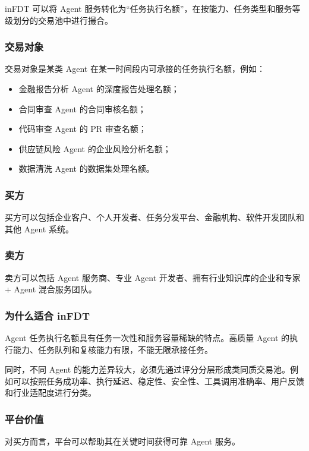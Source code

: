 \documentclass[UTF8,a4paper,12pt]{ctexart}
\begin{document}
inFDT 可以将 Agent 服务转化为“任务执行名额”，在按能力、任务类型和服务等级划分的交易池中进行撮合。

\subsubsection*{交易对象}

交易对象是某类 Agent 在某一时间段内可承接的任务执行名额，例如：

\begin{itemize}
    \item 金融报告分析 Agent 的深度报告处理名额；
    \item 合同审查 Agent 的合同审核名额；
    \item 代码审查 Agent 的 PR 审查名额；
    \item 供应链风险 Agent 的企业风险分析名额；
    \item 数据清洗 Agent 的数据集处理名额。
\end{itemize}

\subsubsection*{买方}

买方可以包括企业客户、个人开发者、任务分发平台、金融机构、软件开发团队和其他 Agent 系统。

\subsubsection*{卖方}

卖方可以包括 Agent 服务商、专业 Agent 开发者、拥有行业知识库的企业和专家 + Agent 混合服务团队。

\subsubsection*{为什么适合 inFDT}

Agent 任务执行名额具有任务一次性和服务容量稀缺的特点。高质量 Agent 的执行能力、任务队列和复核能力有限，不能无限承接任务。

同时，不同 Agent 的能力差异较大，必须先通过评分分层形成类同质交易池。例如可以按照任务成功率、执行延迟、稳定性、安全性、工具调用准确率、用户反馈和行业适配度进行分类。

\subsubsection*{平台价值}

对买方而言，平台可以帮助其在关键时间获得可靠 Agent 服务。
\end{document}
